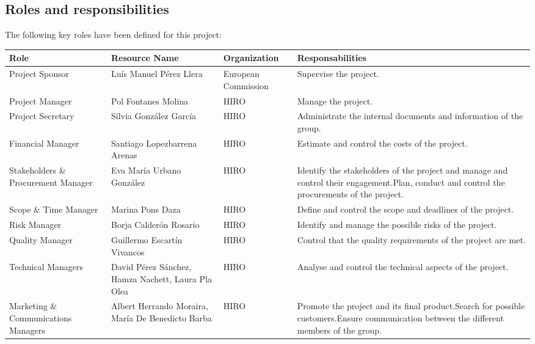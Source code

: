 \subsection{Roles and responsibilities}
The following key roles have been defined for this project:
\begin{center}
	\begin{longtable}{>{\raggedright\arraybackslash}p{3cm}>{\raggedright\arraybackslash}p{3cm}>{\raggedright\arraybackslash}p{3cm}>{\raggedright\arraybackslash}p{5cm}}
		\toprule[2pt]
		\textbf{Role} & \textbf{Resource Name} & \textbf{Organization} & \textbf{Responsabilities} \\ \midrule[1.5pt] \endhead
		Project Sponsor & Luís Manuel Pérez Llera & European Commission & Supervise the project. \\ \hline
		Project Manager & Pol Fontanes Molina & HIRO & Manage the project. \\ \hline
		Project Secretary & Sílvia González García & HIRO & Administrate the internal documents and information of the group. \\ \hline
		Financial Manager & Santiago Lopezbarrena Arenas & HIRO & Estimate and control the costs of the project. \\ \hline
		Stakeholders \& Procurement Manager & Eva María Urbano González & HIRO & Identify the stakeholders of the project and manage and control their engagement.\newline Plan, conduct and control the procurements of the project.\\ \hline
		Scope \& Time Manager & Marina Pons Daza & HIRO & Define and control the scope and deadlines of the project. \\ \hline
		Risk Manager & Borja Calderón Rosario & HIRO & Identify and manage the possible risks of the project. \\ \hline
		Quality Manager & Guillermo Escartín Vivancos & HIRO & Control that the quality requirements of the project are met. \\ \hline
		Technical Managers & David Pérez Sánchez, Hamza Nachett, Laura Pla Olea & HIRO & Analyse and control the technical aspects of the project. \\ \hline
		Marketing \& Communications Managers & Albert Herrando Moraira, María De Benedicto Barba & HIRO & Promote the project and its final product.\newline Search for possible customers.\newline Ensure communication between the different members of the group. \\ \hline

\end{longtable}
\end{center}
